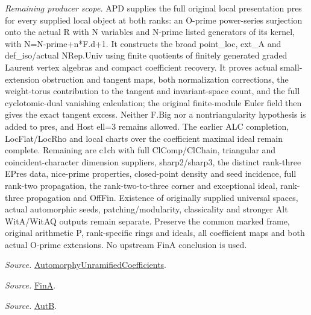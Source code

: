 \emph{Remaining producer scope.} APD supplies the full original local presentation pres for every supplied local object at both ranks: an O-prime power-series surjection onto the actual R with N variables and N-prime listed generators of its kernel, with N=N-prime+n*F.d+1. It constructs the broad point\_\allowbreak loc, ext\_\allowbreak A and def\_\allowbreak iso/actual NRep.Univ using finite quotients of finitely generated graded Laurent vertex algebras and compact coefficient recovery. It proves actual small-extension obstruction and tangent maps, both normalization corrections, the weight-torus contribution to the tangent and invariant-space count, and the full cyclotomic-dual vanishing calculation; the original finite-module Euler field then gives the exact tangent excess. Neither F.Big nor a nontriangularity hypothesis is added to pres, and Host ell=3 remains allowed. The earlier ALC completion, LocFlat/LocRho and local charts over the coefficient maximal ideal remain complete. Remaining are c1ch with full ClComp/ClChain, triangular and coincident-character dimension suppliers, sharp2/sharp3, the distinct rank-three EPres data, nice-prime properties, closed-point density and seed incidence, full rank-two propagation, the rank-two-to-three corner and exceptional ideal, rank-three propagation and OffFin. Existence of originally supplied universal spaces, actual automorphic seeds, patching/modularity, classicality and stronger Alt WitA/WitAQ outputs remain separate. Preserve the common marked frame, original arithmetic P, rank-specific rings and ideals, all coefficient maps and both actual O-prime extensions. No upstream FinA conclusion is used.

\emph{Source.} \href{https://github.com/CocoSgt/riemann-hypothesis-lean/blob/7cbf7a0c32fca1badf05931879a37c3f8a2b03b4/src/Development/AutomorphicArithmetic/AutomorphicVarieties/AutomorphicCases/AutomorphyUnramifiedCoefficients.lean#L24-L27}{AutomorphyUnramifiedCoefficients}.

\emph{Source.} \href{https://github.com/CocoSgt/riemann-hypothesis-lean/blob/7cbf7a0c32fca1badf05931879a37c3f8a2b03b4/src/Development/AutomorphicArithmetic/AutomorphicVarieties/AutomorphicCases/AutomorphyUnramifiedCoefficients.lean#L12-L13}{FinA}.

\emph{Source.} \href{https://github.com/CocoSgt/riemann-hypothesis-lean/blob/7cbf7a0c32fca1badf05931879a37c3f8a2b03b4/src/Development/AutomorphicArithmetic/AutomorphicVarieties/AutomorphicCases/AutomorphyUnramifiedCoefficients.lean#L15-L17}{AutB}.

